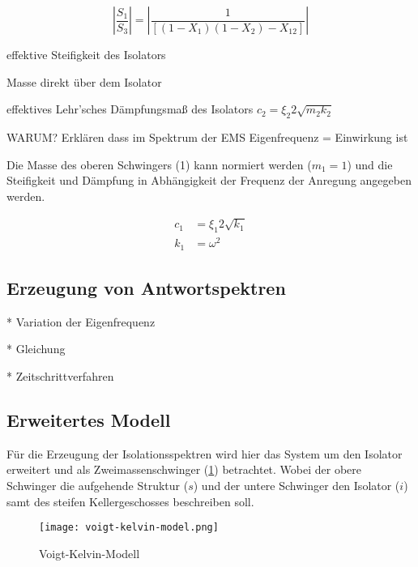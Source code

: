 \begin{equation}\label{eq:VT2DOF}
\left\lvert \frac{S_1}{S_3} \right\rvert = \left\lvert \frac{1}{[(1 - X_1)(1 - X_2) - X_{12}]} \right\rvert
\end{equation}

  effektive Steifigkeit des Isolators\par
{}  Masse direkt über dem Isolator\par
{}  effektives Lehr'sches Dämpfungsmaß des Isolators $c_2 = \xi_2 2 \sqrt{m_2k_2}$\par

WARUM? Erklären dass im Spektrum der EMS Eigenfrequenz = Einwirkung ist

Die Masse des oberen Schwingers (1) kann normiert werden ($m_1 = 1$) und die Steifigkeit und Dämpfung in Abhängigkeit der Frequenz der Anregung angegeben werden.

\begin{align*}
c_1 &= \xi_1 2 \sqrt{k_1}\\
k_1 &= \omega^2
\end{align*}









\subsection{Erzeugung von Antwortspektren}

* Variation der Eigenfrequenz

* Gleichung

* Zeitschrittverfahren

\subsection{Erweitertes Modell}

Für die Erzeugung der Isolationsspektren wird hier das System um den Isolator erweitert und als Zweimassenschwinger (\cref{fig:vkm}) betrachtet.
Wobei der obere Schwinger die aufgehende Struktur ($s$) und der untere Schwinger den Isolator ($i$) samt des steifen Kellergeschosses beschreiben soll.

\begin{figure}[ht]
    \centering
    \texttt{[image: voigt-kelvin-model.png]}
    \caption{Voigt-Kelvin-Modell}
    \label{fig:vkm}
\end{figure}

